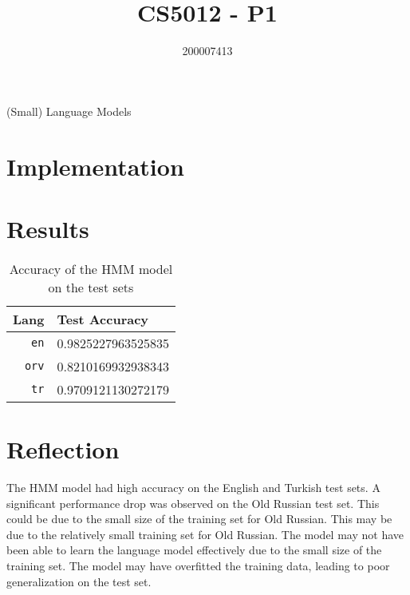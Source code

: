\documentclass[a4paper, 12pt]{article}
\title{CS5012 - P1}
\author{200007413}
\date{}
\begin{document}
\begin{titlepage}
    \centering
    \vspace*{\fill}
    {\Huge\thetitle}

    {\LARGE(Small) Language Models}
    
    {\large\theauthor}
    \vspace*{\fill}
\end{titlepage}

\pagebreak

\section{Implementation}



\pagebreak
\section{Results}

\begin{table}[H]
    \centering
    \begin{tabular}{r | l}
        \textbf{Lang} & \textbf{Test Accuracy} \\
        \hline
        \texttt{en} & 0.9825227963525835 \\
        \hline
        \texttt{orv} & 0.8210169932938343 \\
        \hline
        \texttt{tr} & 0.9709121130272179
    \end{tabular}
    \caption{Accuracy of the HMM model on the test sets}
    \label{tab:hmm-accuracy}
\end{table}

\pagebreak
\section{Reflection}


The HMM model had high accuracy on the English and Turkish test sets. A significant performance drop was observed on the Old Russian test set. This could be due to the small size of the training set for Old Russian. This may be due to the relatively small training set for Old Russian. The model may not have been able to learn the language model effectively due to the small size of the training set. The model may have overfitted the training data, leading to poor generalization on the test set.
\end{document}
